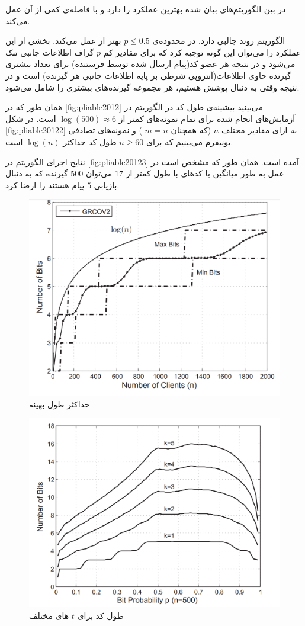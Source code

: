 در بین الگوریتم‌های بیان شده
بهترین عملکرد را دارد و
با فاصله‌ی کمی از آن عمل می‌کند.

الگوریتم
روند جالبی دارد. در محدوده‌ی 
$p \leq 0.5$
بهتر از
عمل می‌کند. بخشی از این عملکرد را می‌توان این گونه توجیه کرد که برای مقادیر کم
$p$
گراف اطلاعات جانبی تنک می‌شود و در نتیجه هر عضو کد(پیام ارسال شده توسط فرستنده)  برای تعداد بیشتری گیرنده حاوی اطلاعات(آنتروپی شرطی بر پایه اطلاعات جانبی هر گیرنده) است و در نتیجه وقتی به دنبال پوشش هستیم، هر مجموعه گیرنده‌های بیشتری را شامل می‌شود.

همان طور که در
\autoref{fig:pliable2012}
می‌بینید بیشینه‌ی طول کد در الگوریتم
در آزمایش‌های انجام شده برای تمام نمونه‌های
\picod
کمتر از
$\log(500) \approx 6$
است. در شکل
\autoref{fig:pliable20122}
به ازای مقادیر محتلف 
$n$
(که همچنان
$m = n$
) و نمونه‌های تصادفی یونیفرم می‌بینیم که برای
$n \geq 60$
طول کد حداکثر
$\log(n)$
است.

نتایج اجرای الگوریتم
در 
\autoref{fig:pliable20123}
آمده است. همان طور که مشخص است در عمل به طور میانگین با کدهای با طول کمتر از
$17$
می‌توان 
$500$
گیرنده که به دنبال بازیابی 
$5$
پیام هستند را ارضا کرد.
\begin{figure}
	\centering
	\includegraphics[width=0.7\linewidth]{figs/ch3/pliable2012_2}
	\caption[حداکثر طول بهینه
	]{
		حداکثر طول بهینه
		\cite{pliablefirstpaper}}
	\label{fig:pliable20122}
\end{figure}
\begin{figure}
	\centering
	\includegraphics[width=0.7\linewidth]{figs/ch3/pliable2012_3}
	\caption[
	طول کد برای
	$t$
	های مختلف
	]{
		طول کد برای
		$t$
		های مختلف
		\cite{pliablefirstpaper}}
	\label{fig:pliable20123}
\end{figure}

